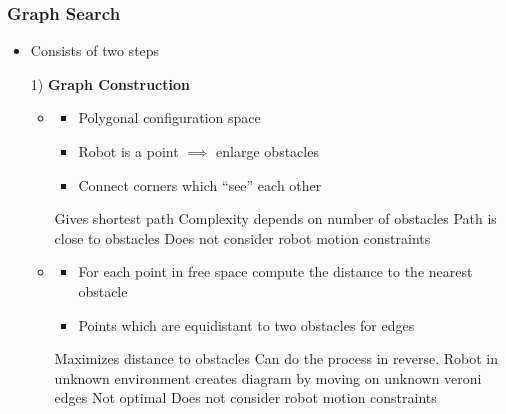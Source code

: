\subsubsection{Graph Search}
\begin{itemize}
     Search path in connectivity graph of free space
    \item Consists of two steps
    \item[1)] \textbf{Graph Construction}
        \begin{itemize}
                \begin{itemize}
                    \item
                        \begin{itemize}
                            \item Polygonal configuration space
                            \item Robot is a point $\implies$ enlarge obstacles
                            \item Connect corners which ``see'' each other
                        \end{itemize}
                    \ipro Gives shortest path
                    \icon Complexity depends on number of obstacles
                    \icon Path is close to obstacles
                    \icon Does not consider robot motion constraints
                \end{itemize}
                \begin{itemize}
                    \item
                        \begin{itemize}
                            \item For each point in free space compute the distance to the nearest obstacle
                            \item Points which are equidistant to two obstacles for edges
                        \end{itemize}
                    \ipro Maximizes distance to obstacles
                    \ipro Can do the process in reverse. Robot in unknown environment creates diagram by moving on unknown veroni edges
                    \icon Not optimal
                    \icon Does not consider robot motion constraints
                \end{itemize}
                \begin{itemize}

\end{itemize}
\end{itemize}
\end{itemize}
